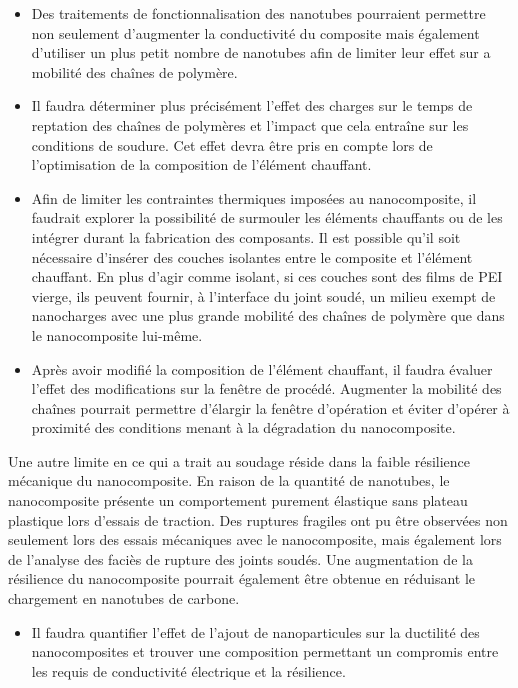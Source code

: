 \begin{itemize}
	\item Des traitements de fonctionnalisation des nanotubes pourraient permettre non seulement d'augmenter la conductivité du composite mais également d'utiliser un plus petit nombre de nanotubes afin de limiter leur effet sur a mobilité des chaînes de polymère. 
	\item Il faudra déterminer plus précisément l'effet des charges sur le temps de reptation des chaînes de polymères et l'impact que cela entraîne sur les conditions de soudure. 
	Cet effet devra être pris en compte lors de l'optimisation de la composition de l'élément chauffant. 
	\item Afin de limiter les contraintes thermiques imposées au nanocomposite, il faudrait explorer la possibilité de surmouler les éléments chauffants ou de les intégrer durant la fabrication des composants. 
	Il est possible qu'il soit nécessaire d'insérer des couches isolantes entre le composite et l'élément chauffant. 
	En plus d'agir comme isolant, si ces couches sont des films de PEI vierge, ils peuvent fournir, à l'interface du joint soudé, un milieu exempt de nanocharges avec une plus grande mobilité des chaînes de polymère que dans le nanocomposite lui-même. 
	\item Après avoir modifié la composition de l'élément chauffant, il faudra évaluer l'effet  des modifications sur la fenêtre de procédé. 
	Augmenter la mobilité des chaînes pourrait permettre d'élargir la fenêtre d'opération et éviter d'opérer à proximité des conditions menant à la dégradation du nanocomposite. 
\end{itemize}

Une autre limite en ce qui a trait au soudage réside dans la faible résilience mécanique du nanocomposite. 
En raison de la quantité de nanotubes, le nanocomposite présente un comportement purement élastique sans plateau plastique lors d'essais de traction. 
Des ruptures fragiles ont pu être observées non seulement lors des essais mécaniques avec le nanocomposite, mais également lors de l'analyse des faciès de rupture des joints soudés. 
Une augmentation de la résilience du nanocomposite pourrait également être obtenue en réduisant le chargement en nanotubes de carbone. 

\begin{itemize}
	\item Il faudra quantifier l'effet de l'ajout de nanoparticules sur la ductilité des nanocomposites et trouver une composition permettant un compromis entre les requis de conductivité électrique et la résilience. 
\end{itemize}

